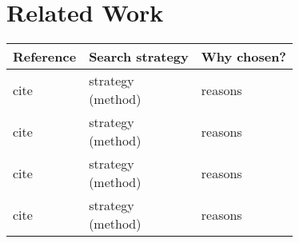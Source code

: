 \documentclass[oneside, notitlepage, twocolumn]{scrartcl}
\newcommand{\tableheadline}[1]{\textbf{#1}}
\begin{document}
\section{Related Work}
\begin{adjustbox}{angle=90}
\begin{tabularx}{\textwidth}{lXX}
    \tableheadline{Reference} & \tableheadline{Search strategy} & \tableheadline{Why chosen?}\\
    \midrule
    cite & \makecell{strategy\\(method)} & reasons\\
    \midrule
    cite & \makecell{strategy\\(method)} & reasons\\
    \midrule
    cite & \makecell{strategy\\(method)}& reasons\\
    \midrule
    cite & \makecell{strategy\\(method)}& reasons\\
\end{tabularx}
\end{adjustbox}
\end{document}
